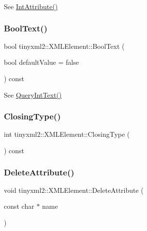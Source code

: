 See \hyperlink{classtinyxml2_1_1_x_m_l_element_a95a89b13bb14a2d4655e2b5b406c00d4}{Int\+Attribute()} 

\mbox{\label{classtinyxml2_1_1_x_m_l_element_a68569f59f6382bcea7f5013ec59736d2}} 
\subsubsection{\texorpdfstring{Bool\+Text()}{BoolText()}}
{\footnotesize\ttfamily bool tinyxml2\+::\+X\+M\+L\+Element\+::\+Bool\+Text (\begin{DoxyParamCaption}\item[{bool}]{default\+Value = {\ttfamily false} }\end{DoxyParamCaption}) const}



See \hyperlink{classtinyxml2_1_1_x_m_l_element_a926357996bef633cb736e1a558419632}{Query\+Int\+Text()} 

\mbox{\label{classtinyxml2_1_1_x_m_l_element_ac820806b6c14af6833dcbcf0957b6d61}} 
\subsubsection{\texorpdfstring{Closing\+Type()}{ClosingType()}}
{\footnotesize\ttfamily int tinyxml2\+::\+X\+M\+L\+Element\+::\+Closing\+Type (\begin{DoxyParamCaption}{ }\end{DoxyParamCaption}) const\hspace{0.3cm}{\ttfamily [inline]}}

\mbox{\label{classtinyxml2_1_1_x_m_l_element_aebd45aa7118964c30b32fe12e944628a}} 
\subsubsection{\texorpdfstring{Delete\+Attribute()}{DeleteAttribute()}}
{\footnotesize\ttfamily void tinyxml2\+::\+X\+M\+L\+Element\+::\+Delete\+Attribute (\begin{DoxyParamCaption}\item[{const char $\ast$}]{name }\end{DoxyParamCaption})}

